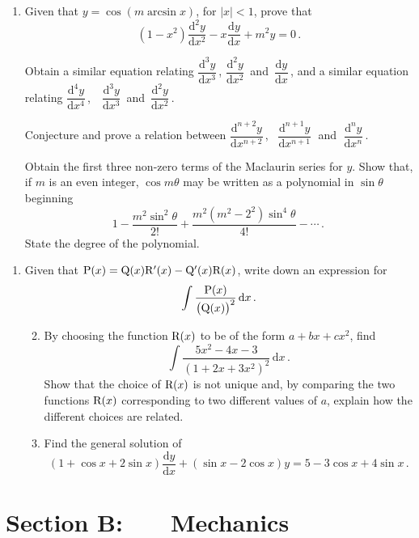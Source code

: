 \documentclass[a4, 11pt]{report}
\newlength{\qspace}
\newcounter{qnumber}
\newenvironment{question}%
 {\vspace{\qspace}
  \begin{enumerate}[\bfseries 1\quad][10]%
    \setcounter{enumi}{\value{qnumber}}%
    \item%
 }
{
  \end{enumerate}
  \filbreak
  \stepcounter{qnumber}
 }
\newenvironment{questionparts}[1][1]%
 {
  \begin{enumerate}[\bfseries (i)]%
    \setcounter{enumii}{#1}
    \addtocounter{enumii}{-1}
    \setlength{\itemsep}{5mm}
    \setlength{\parskip}{8pt}
 }
 {
  \end{enumerate}
 }
\def\d{{\mathrm d}}
\begin{document}
\begin{question}
Given that $y = \cos(m \arcsin x)$, for $\vert x \vert <1$,
prove that
\[
(1-x^2) \frac {\d^2 y}{\d x^2} -x \frac {\d y}{\d x} +m^2y=0\,.
\]

Obtain a similar equation relating $\dfrac{\d^3y}{\d x^3}\,$,\; 
 $\dfrac{\d^2y}{\d x^2}\, $ and $\, \dfrac{\d y}{\d x}\,$, and a
similar equation
relating 
$\dfrac{\d^4y}{\d x^4}\,$,~~$\dfrac{\d^3y}{\d x^3}\,$ and 
$\,\dfrac{\d^2 y}{\d x^2}\,$.

Conjecture and prove 
 a relation between  
$\dfrac{\d^{n+2}y}{\d x^{n+2}}\,$,  \ 
$\dfrac{\d^{n+1}y}{\d x^{n+1}}\;$ and $\;\dfrac{\d^n y}{\d x^n}\,$.



Obtain the first three non-zero terms of the 
Maclaurin series for $y$. Show that, if $m$ is an even
integer, $\cos m\theta$  may be written as a polynomial in $\sin\theta$
beginning
\[
1 - \frac{m^2\sin^2\theta}{2!}+ \frac{m^2(m^2-2^2)\sin^4\theta}{4!} -\cdots \,.
\, \tag{$\vert\theta\vert < \tfrac12 \pi$}
\]
State the degree of the polynomial. 
\end{question}
		
\begin{question}
Given that ${\rm P} (x) = {\rm Q} (x){\rm R}'(x) - {\rm Q}'(x){\rm R}(x)$, 
write down an expression for
\[
\int   \frac{{\rm P} ( x)}{ \big( {\rm Q} ( x)\big )^ 2}\, \d x\, .
\]

\begin{questionparts}
\item
By choosing  the function ${\rm R}(x)$ to be of the form
$a +bx+c x^2$,
find  
\[
\int \frac{5x^2 - 4x - 3} {(1 + 2x + 3x^2 )^2 } \, \d x
\,.\]
Show that the choice of ${\rm R}(x)$ is not unique and, by comparing 
the two functions  ${\rm R}(x)$ corresponding to two different values of 
$a$, explain how the different
choices are related.

\item
Find  the general solution of 
\[
(1+\cos x +2 \sin x) \frac {\d y}{\d x} 
+(\sin x -2 \cos x)y = 5 - 3 \cos x + 4 \sin x\,.
\]



\end{questionparts}
\end{question}	
		

		
	
\newpage
\section*{Section B: \ \ \ Mechanics}
\end{document}
